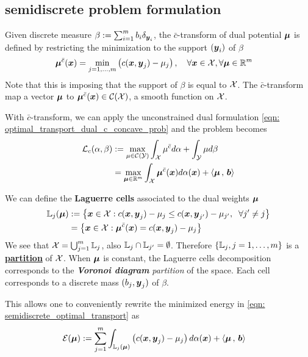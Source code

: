 \documentclass[11pt]{article}
\begin{document}
\subsection{semidiscrete problem formulation}
Given discrete measure $\beta := \sum_{i=1}^{m}b_i \delta_{\boldsymbol{y}_{i}}$, the $\bar{c}$-transform of dual potential $\boldsymbol{\mu}$ is defined by restricting the minimization to the support $(\boldsymbol{y}_{i})$ of $\beta$
\begin{align}
\boldsymbol{\mu}^{\bar{c}}(\boldsymbol{x}) &= \min_{j=1,\ldots, m}\left(c(\boldsymbol{x}, \boldsymbol{y}_j) - \mu_{j}\right), \quad \forall \boldsymbol{x}\in {\mathcal X}, \forall \boldsymbol{\mu} \in {\mathbb R}^{m} \label{eqn: c_bar_transform_semidiscrete}
\end{align} Note that this is imposing that the support of $\beta$ is equal to ${\mathcal X}$. The $\bar{c}$-transform map a vector $\boldsymbol{\mu}$ to $\boldsymbol{\mu}^{\bar{c}}(\boldsymbol{x})  \in {\mathcal C}({\mathcal X})$, a smooth function on ${\mathcal X}$.

With $\bar{c}$-transform, we can apply the unconstrained dual formulation \eqref{eqn: optimal_transport_dual_c_concave_prob} and the problem becomes
\begin{align}
{\mathcal L}_{c}(\alpha, \beta)&:=  \max_{\mu \in  {\mathcal C}({\mathcal Y})} \int_{{\mathcal X}}\mu^{\bar{c}} d\alpha + \int_{{\mathcal Y}} \mu d\beta \nonumber\\
&= \max_{\boldsymbol{\mu}  \in  {\mathbb R}^{m}} \int_{{\mathcal X}}\boldsymbol{\mu}^{\bar{c}}(\boldsymbol{x}) d\alpha(\boldsymbol{x}) + \left\langle \boldsymbol{\mu}\,,\, \boldsymbol{b} \right\rangle \label{eqn: semidiscrete_optimal_transport}
\end{align}

We can define the \textbf{Laguerre cells} associated to the dual weights $\boldsymbol{\mu}$
\begin{align}
{\mathbb L}_{j}(\boldsymbol{\mu}) &:= \left\{\boldsymbol{x} \in {\mathcal X}: c(\boldsymbol{x}, \boldsymbol{y}_{j}) - \mu_{j} \le c(\boldsymbol{x}, \boldsymbol{y}_{j'}) - \mu_{j'}, \;\;   \forall j' \neq j\right\} \label{eqn: laguerre_cell_dual_c_bar}\\
& = \left\{\boldsymbol{x} \in {\mathcal X}: \boldsymbol{\mu}^{\bar{c}}(\boldsymbol{x}) = c(\boldsymbol{x}, \boldsymbol{y}_j) - \mu_{j}\right\} \nonumber
\end{align} We see that ${\mathcal X} = \bigcup_{j=1}^{m}{\mathbb L}_{j}$, also ${\mathbb L}_{j} \cap {\mathbb L}_{j'} = \emptyset$. Therefore $\left\{{\mathbb L}_{j}, j=1,\ldots,m\right\}$ is a \underline{\textbf{partition}} of ${\mathcal X}$. When $\boldsymbol{\mu}$ is constant, the Laguerre cells decomposition corresponds to the \textbf{\emph{Voronoi diagram}} \emph{partition} of the space. Each cell corresponds to a discrete mass $(b_j, \boldsymbol{y}_j)$ of $\beta$.

This allows one to conveniently rewrite the minimized energy in \eqref{eqn: semidiscrete_optimal_transport} as
\begin{align}
{\mathcal E}(\boldsymbol{\mu})&:=  \sum_{j=1}^{m}\int_{{\mathbb L}_{j}(\boldsymbol{\mu}) }\left(c(\boldsymbol{x}, \boldsymbol{y}_j) - \mu_{j}\right) d\alpha(\boldsymbol{x}) + \left\langle \boldsymbol{\mu}\,,\, \boldsymbol{b} \right\rangle  \label{eqn: semidiscrete_optimal_transport_partition_obj}
\end{align}
\end{document}
